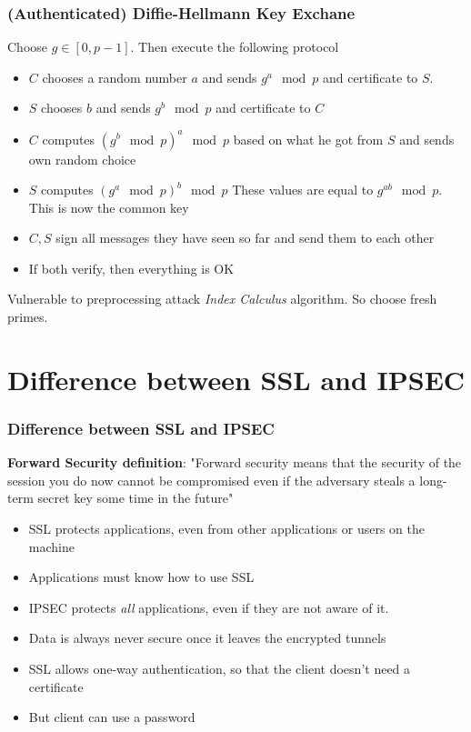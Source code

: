 \documentclass[14pt]{beamer}
\begin{document}
    \begin{frame}
           \frametitle{(Authenticated) Diffie-Hellmann Key Exchane}
            Choose $g \in [0, p-1]$. Then execute the following protocol
            \begin{itemize}
                \item $C$ chooses a random number $a$ and sends $g^a \mod p$ and certificate to $S$. 
                \item $S$ chooses $b$ and sends $g^b \mod p$ and certificate to $C$
                \item $C$ computes $(g^b \mod p)^a \mod p$ based on what he got from $S$ and sends own random choice
                \item $S$ computes $(g^a \mod p)^b \mod p$ These values are equal to $g^{ab} \mod p$. This is now the common key
                \item $C, S$ sign all messages they have seen so far and send them to each other
                \item If both verify, then everything is OK
            \end{itemize}
            Vulnerable to preprocessing attack \textit{Index Calculus} algorithm. So choose fresh primes.
    \end{frame}


\section{Difference between SSL and IPSEC}

    \begin{frame}
        \frametitle{Difference between SSL and IPSEC}
        \textbf{Forward Security definition}: "Forward security means that the security of the session you do now cannot be compromised even if the adversary steals a long-term secret key some time in the future"
        \begin{itemize}
            \item SSL protects applications, even from other applications or users on the machine
            \item Applications must know how to use SSL
            \item IPSEC protects \textit{all} applications, even if they are not aware of it. 
            \item Data is always never secure once it leaves the encrypted tunnels
            \item SSL allows one-way authentication, so that the client doesn't need a certificate
            \item But client can use a password
        \end{itemize}
    \end{frame}
\end{document}
